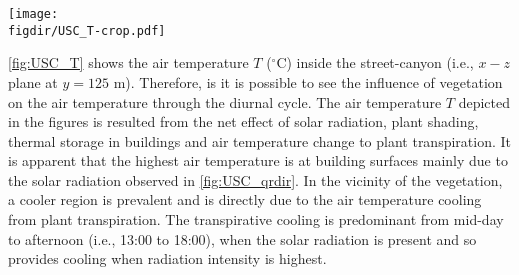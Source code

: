 \begin{sidewaysfigure}[p]
	\centering
	\texttt{[image: \\figdir/USC\_T-crop.pdf]}
	\caption{Air temperature $T$ ($^{\circ}$C) inside the street-canyon where the vegetation zone is indicated by a green box. The plot shows the fields with a $150$ minutes interval from $03$:$00$ (HH:MM) to $23$:$00$ (HH:MM).}
	\label{fig:USC_T}
\end{sidewaysfigure}

\cref{fig:USC_T} shows the air temperature $T$ ($^{\circ}$C) inside the street-canyon (i.e., $x-z$ plane at $y=125$ m). Therefore, is it is possible to see the influence of vegetation on the air temperature through the diurnal cycle. The air temperature $T$ depicted in the figures is resulted from the net effect of solar radiation, plant shading, thermal storage in buildings and air temperature change to plant transpiration. It is apparent that the highest air temperature is at building surfaces mainly due to the solar radiation observed in \cref{fig:USC_qrdir}. In the vicinity of the vegetation, a cooler region is prevalent and is directly due to the air temperature cooling from plant transpiration. The transpirative cooling is predominant from mid-day to afternoon (i.e., 13:00 to 18:00), when the solar radiation is present and so provides cooling when radiation intensity is highest. %


